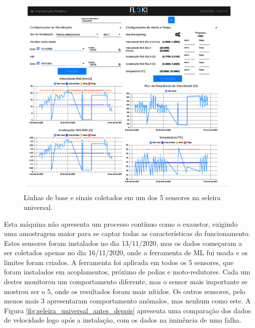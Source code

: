 \begin{figure}[H]
    \caption{Linhas de base e sinais coletados em um dos 5 sensores na seleira universal.}
    \begin{center}
        \includegraphics[scale=0.9, page=4]{resultados/img/resultados.pdf}
    \end{center}
    \label{fig:seleira_universal}
\end{figure}

Esta máquina não apresenta um processo contínuo como o exaustor, exigindo uma amostragem maior para se captar todas as características do 
funcionamento. Estes sensores foram instalados no dia 13/11/2020, mas os dados começaram a ser coletados apenas no dia 16/11/2020, onde a 
ferramenta de ML fui usada e os limites foram criados. 
A ferramenta foi aplicada em todos os 5 sensores, que foram instalados em acoplamentos, próximo de polias e moto-redutores.
Cada um destes monitorou um comportamento diferente, mas o sensor mais importante se mostrou ser o 5, onde os resultados foram mais nítidos. 
Os outros sensores, pelo menos mais 3 apresentaram comportamento anômalos, mas nenhum como este. A Figura \ref{fig:seleira_universal_antes_depois}
apresenta uma comparação dos dados de velocidade logo após a instalação, com os dados na iminência de uma falha.

